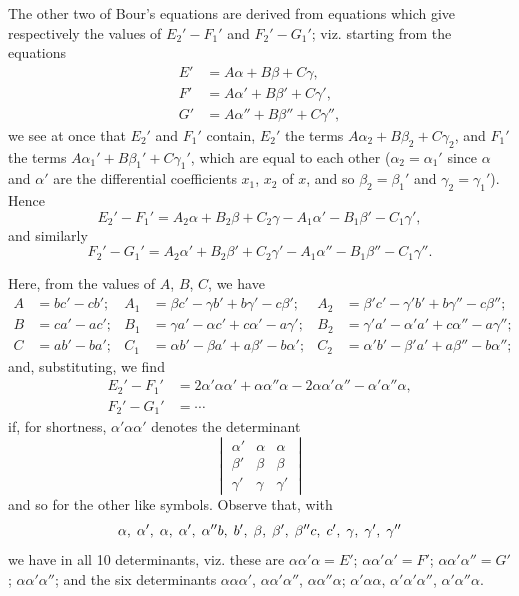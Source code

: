\documentclass[11pt,a4paper]{book}
\begin{document}
The other two of Bour's equations are derived from equations which give respectively the values of $E_2' - F_1'$ and $F_2' - G_1'$; viz. starting from the equations
\[
\begin{aligned}
E' &= A\alpha + B\beta + C\gamma,\\
F' &= A\alpha' + B\beta' + C\gamma',\\
G' &= A\alpha'' + B\beta'' + C\gamma'',
\end{aligned}
\]
we see at once that $E_2'$ and $F_1'$ contain, $E_2'$ the terms $A\alpha_2 + B\beta_2 + C\gamma_2$, and $F_1'$ the terms $A\alpha_1' + B\beta_1' + C\gamma_1'$, which are equal to each other ($\alpha_2 = \alpha_1'$ since $\alpha$ and $\alpha'$ are the differential coefficients $x_1$, $x_2$ of $x$, and so $\beta_2 = \beta_1'$ and $\gamma_2 = \gamma_1'$). Hence
\[
E_2' - F_1' = A_2\alpha + B_2\beta + C_2\gamma - A_1\alpha' - B_1\beta' - C_1\gamma',
\]
and similarly
\[
F_2' - G_1' = A_2\alpha' + B_2\beta' + C_2\gamma' - A_1\alpha'' - B_1\beta'' - C_1\gamma''.
\]

Here, from the values of $A$, $B$, $C$, we have
\[
\begin{aligned}
A &= bc' - cb'; & A_1 &= \beta c' - \gamma b' + b\gamma' - c\beta'; & A_2 &= \beta'c' - \gamma'b' + b\gamma'' - c\beta'';\\
B &= ca' - ac'; & B_1 &= \gamma a' - \alpha c' + c\alpha' - a\gamma'; & B_2 &= \gamma'a' - \alpha'a' + c\alpha'' - a\gamma'';\\
C &= ab' - ba'; & C_1 &= \alpha b' - \beta a' + a\beta' - b\alpha'; & C_2 &= \alpha'b' - \beta'a' + a\beta'' - b\alpha'';
\end{aligned}
\]
and, substituting, we find
\[
\begin{aligned}
E_2' - F_1' &= 2\alpha'\alpha\alpha' + \alpha\alpha''\alpha - 2\alpha\alpha'\alpha'' - \alpha'\alpha''\alpha,\\
F_2' - G_1' &= \dotsb
\end{aligned}
\]
if, for shortness, $\alpha'\alpha\alpha'$ denotes the determinant
\[
\begin{vmatrix}
\alpha' & \alpha & \alpha \\
\beta' & \beta & \beta \\
\gamma' & \gamma & \gamma'
\end{vmatrix}
\]
and so for the other like symbols. Observe that, with
\[
\alpha,\; \alpha',\; \alpha,\; \alpha',\; \alpha''\\
b,\; b',\; \beta,\; \beta',\; \beta''\\
c,\; c',\; \gamma,\; \gamma',\; \gamma''
\]
we have in all 10 determinants, viz. these are $\alpha\alpha'\alpha = E'$; $\alpha\alpha'\alpha' = F'$; $\alpha\alpha'\alpha'' = G'$; $\alpha\alpha'\alpha''$; and the six determinants $\alpha\alpha\alpha'$, $\alpha\alpha'\alpha''$, $\alpha\alpha''\alpha$; $\alpha'\alpha\alpha$, $\alpha'\alpha'\alpha''$, $\alpha'\alpha''\alpha$.
\end{document}

